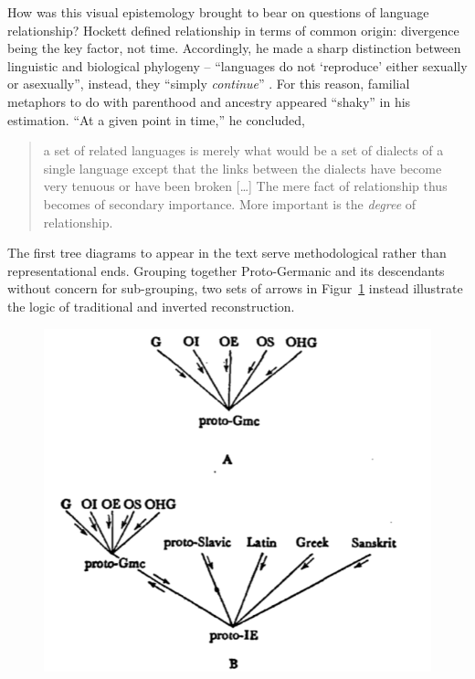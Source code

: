 \documentclass[output=paper]{langscibook}
\begin{document}
How was this visual epistemology brought to bear on questions of language relationship? Hockett defined relationship in terms of common origin: divergence being the key factor, not time. Accordingly, he made a sharp distinction between linguistic and biological phylogeny -- ``languages do not `reproduce' either sexually or asexually'', instead, they ``simply \emph{continue}'' \citep[369]{Hockett19591958}. For this reason, familial metaphors to do with parenthood and ancestry appeared ``shaky'' in his estimation. ``At a given point in time,'' he concluded,

\begin{quotation}
a set of related languages is merely what would be a set of dialects of a single language except that the links between the dialects have become very tenuous or have been broken […] The mere fact of relationship thus becomes of secondary importance. More important is the \emph{degree} of relationship. \citep[369]{Hockett19591958}
\end{quotation}

The first tree diagrams to appear in the text serve methodological rather than representational ends. Grouping together Proto-Germanic and its descendants without concern for sub-grouping, two sets of arrows in Figur~\ref{fig:kaplan:hockett1959514} instead illustrate the logic of traditional and inverted reconstruction.

\begin{figure}
    \centering
    \includegraphics[scale=1]{figures/hockett1958-514.png}
    \caption{\citet[514]{Hockett19591958}}
    \label{fig:kaplan:hockett1959514}
\end{figure}
\end{document}

